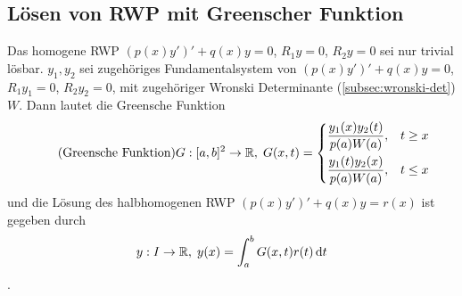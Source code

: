\subsection{Lösen von RWP mit Greenscher Funktion}
Das homogene RWP $\left(p(x)y'\right)' + q(x)y = 0$, $R_1y=0$, $R_2y=0$ sei nur trivial lösbar. $y_1, y_2$ sei zugehöriges Fundamentalsystem von $\left(p(x)y'\right)' + q(x)y = 0$, $R_1y_1=0$, $R_2y_2=0$,  mit zugehöriger Wronski Determinante (\ref{subsec:wronski-det}) $W$. Dann lautet die Greensche Funktion
\begin{equation}
    \tag{Greensche Funktion}
    \label{eq:greensche-fkt}
    G: [a,b]^2 \rightarrow \mathbb{R},\; G(x,t) = 
    \begin{dcases}
        \frac{y_1(x)y_2(t)}{p(a)W(a)}, & t\geq x\\
        \frac{y_1(t)y_2(x)}{p(a)W(a)}, & t\leq x
    \end{dcases}
\end{equation}
und die Lösung des halbhomogenen RWP $\left(p(x)y'\right)' + q(x)y = r(x)$ ist gegeben durch
\begin{equation*}
    y: I \rightarrow \mathbb{R},\; y(x) = \int_a^b G(x,t)r(t)\mathop{}\!\mathrm{d} t
\end{equation*}.